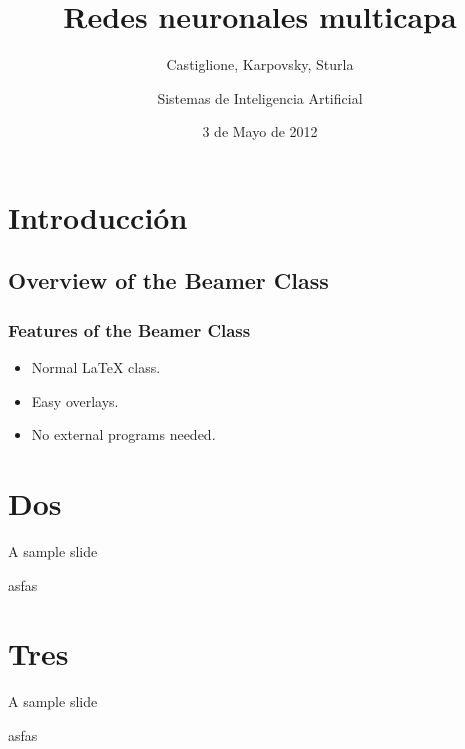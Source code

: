 \documentclass{beamer}
\title{Redes neuronales multicapa}
\subtitle{Castiglione, Karpovsky, Sturla }
\author{Sistemas de Inteligencia Artificial}
\date{3 de Mayo de 2012}
\begin{document}
\frame{\titlepage}

\section[Outline]{}
\frame{\tableofcontents}

\section{Introducción}
\subsection{Overview of the Beamer Class}
\frame
{
  \frametitle{Features of the Beamer Class}

  \begin{itemize}
  \item<1-> Normal LaTeX class.
  \item<2-> Easy overlays.
  \item<3-> No external programs needed.      
  \end{itemize}
}


\section{Dos}
\begin{frame}{A sample slide}
\par asfas
\end{frame}
\section{Tres}
\begin{frame}{A sample slide}
\par asfas
\end{frame}
\end{document}
